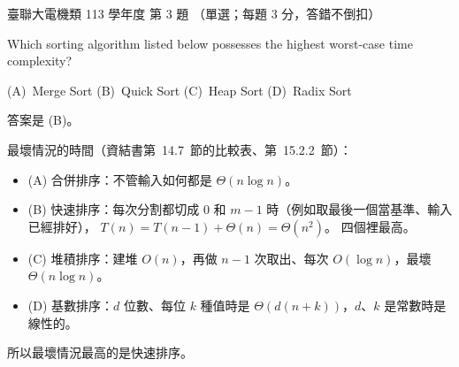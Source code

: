 \begin{pastexam}[label={px:ust-113-ee-ds-03}]{臺聯大電機類 113 學年度 第 3 題}
（單選；每題 3 分，答錯不倒扣）

Which sorting algorithm listed below possesses the highest worst-case time complexity?

(A)~Merge Sort \qquad (B)~Quick Sort \qquad (C)~Heap Sort \qquad (D)~Radix Sort
\end{pastexam}

\begin{pastsoln}
答案是 (B)。

最壞情況的時間（資結書第~14.7~節的比較表、第~15.2.2~節）：
\begin{itemize}
\item (A) 合併排序：不管輸入如何都是 $\Theta(n\log n)$。
\item (B) 快速排序：每次分割都切成 $0$ 和 $m - 1$ 時（例如取最後一個當基準、輸入已經排好），
$T(n) = T(n-1) + \Theta(n) = \Theta(n^2)$。 四個裡最高。
\item (C) 堆積排序：建堆 $O(n)$，再做 $n - 1$ 次取出、每次 $O(\log n)$，最壞 $\Theta(n\log n)$。
\item (D) 基數排序：$d$ 位數、每位 $k$ 種值時是 $\Theta(d(n + k))$，$d$、$k$ 是常數時是線性的。
\end{itemize}
所以最壞情況最高的是快速排序。
\end{pastsoln}
